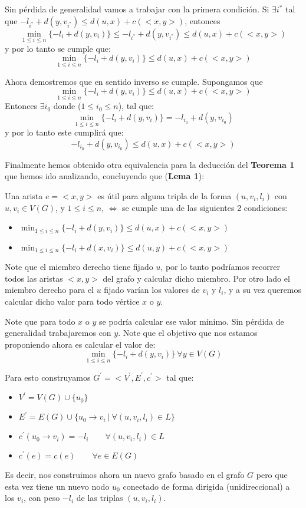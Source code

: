 \documentclass[a4paper]{article}
\begin{document}
	Sin pérdida de generalidad vamos a trabajar con la primera condición. Si $\exists i^*$  tal que $-l_{i^*} + d(y,v_{i^*}) \le d(u,x) + c(<x,y>)$, entonces $$\min_{1\le i \le n}\{-l_{i} + d(y,v_{i})\} \le -l_{i^*} + d(y,v_{i^*}) \le d(u,x) + c(<x,y>) $$
	y por lo tanto se cumple que:
	$$\min_{1\le i \le n}\{-l_{i} + d(y,v_{i})\} \le d(u,x) + c(<x,y>) $$
	
	Ahora demostremos que en sentido inverso se cumple. Supongamos que 
	$$\min_{1\le i \le n}\{-l_{i} + d(y,v_{i})\} \le d(u,x) + c(<x,y>) $$
	Entonces $\exists i_0$	donde ($1 \le i_0 \le n$), tal que:
	$$ \min_{1\le i \le n}\{-l_{i} + d(y,v_{i})\} = -l_{i_0} + d(y,v_{i_0}) $$
	y por lo tanto este cumplirá que:
	$$ -l_{i_0} + d(y,v_{i_0}) \le d(u,x) + c(<x,y>) $$
	
	Finalmente hemos obtenido otra equivalencia para la deducción del \textbf{Teorema 1} que hemos ido analizando, concluyendo que (\textbf{Lema 1}):
	
	Una arista $e=<x,y>$ es útil para alguna tripla de la forma $(u,v_i,l_i)$ con $u,v_i \in V(G)$, y $1\le i \le n$, $\Leftrightarrow$ se cumple una de las siguientes 2 condiciones:
	\begin{itemize}
		\item $\min_{1\le i \le n}\{-l_{i} + d(y,v_{i})\} \le d(u,x) + c(<x,y>)$
		\item $\min_{1\le i \le n}\{-l_{i} + d(x,v_{i})\} \le d(u,y) + c(<x,y>)$
	\end{itemize}

	Note que el miembro derecho tiene fijado $u$, por lo tanto podríamos recorrer todos las aristas $<x,y>$ del grafo y calcular dicho miembro. Por otro lado el miembro derecho para el $u$ fijado varían los valores de $v_i$ y $l_i$, y a su vez queremos calcular dicho valor para todo vértice $x$ o $y$.
	
	Note que para todo $x$ o $y$ se podría calcular ese valor mínimo. Sin pérdida de generalidad trabajaremos con $y$. Note que el objetivo que nos estamos proponiendo ahora es calcular el valor de:
	$$\min_{1\le i \le n}\{-l_{i} + d(y,v_{i})\} ~ \forall y \in V(G)$$
	
	Para esto construyamos $G^\prime=<V^\prime,E^\prime, c^\prime>$ tal que:
	\begin{itemize}
		\item $V^\prime = V(G)\cup\{u_0\}$
		\item $E^\prime = E(G)\cup \{u_0\rightarrow v_i ~ | ~ \forall (u,v_i,l_i)\in L\}$
		\item $c^\prime(u_0 \rightarrow v_i) = -l_i \qquad \forall (u,v_i,l_i)\in L$
		\item $c^\prime(e) = c(e) \qquad \forall e\in E(G)$
	\end{itemize}
	Es decir, nos construimos ahora un nuevo grafo basado en el grafo $G$ pero que esta vez tiene un nuevo nodo $u_0$ conectado de forma dirigida (unidireccional) a los $v_i$, con peso $-l_i$ de las triplas $(u, v_i,l_i)$.
	
\end{document}
